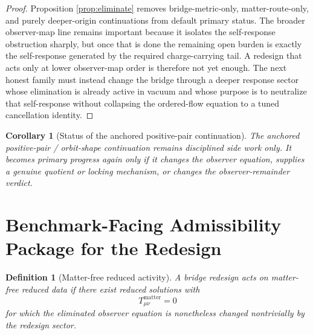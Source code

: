 \documentclass[11pt]{article}
\newtheorem{definition}{Definition}
\newtheorem{corollary}{Corollary}
\begin{document}
\begin{proof}
Proposition \ref{prop:eliminate} removes bridge-metric-only, matter-route-only, and purely deeper-origin continuations from default primary status. The broader observer-map line remains important because it isolates the self-response obstruction sharply, but once that is done the remaining open burden is exactly the self-response generated by the required charge-carrying tail. A redesign that acts only at lower observer-map order is therefore not yet enough. The next honest family must instead change the bridge through a deeper response sector whose elimination is already active in vacuum and whose purpose is to neutralize that self-response without collapsing the ordered-flow equation to a tuned cancellation identity.
\end{proof}

\begin{corollary}[Status of the anchored positive-pair continuation]
The anchored positive-pair / orbit-shape continuation remains disciplined side work only. It becomes primary progress again only if it changes the observer equation, supplies a genuine quotient or locking mechanism, or changes the observer-remainder verdict.
\end{corollary}

\section{Benchmark-Facing Admissibility Package for the Redesign}

\begin{definition}[Matter-free reduced activity]
\label{def:matterfree}
A bridge redesign acts \emph{on matter-free reduced data} if there exist reduced solutions with
\begin{equation}
T_{\mu\nu}^{\mathrm{matter}}=0
\label{eq:matterfree}
\end{equation}
for which the eliminated observer equation is nonetheless changed nontrivially by the redesign sector.
\end{definition}
\end{document}
